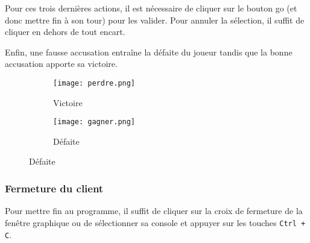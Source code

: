 Pour ces trois dernières actions, il est nécessaire de cliquer sur le bouton go (et donc mettre fin à son tour) pour les valider. Pour annuler la sélection, il suffit de cliquer en dehors de tout encart.

Enfin, une fausse accusation entraîne la défaite du joueur tandis que la bonne accusation apporte sa victoire.

\begin{figure}[H]
     \centering
     \begin{subfigure}{.45\linewidth}
         \centering
         \texttt{[image: perdre.png]}
         \caption{Victoire}
		\label{fig:victoire}
     \end{subfigure}
     \hspace{1em}
     \begin{subfigure}{.45\linewidth}
         \centering
         \texttt{[image: gagner.png]}
         \caption{Défaite}
		\label{fig:defaite}
     \end{subfigure}
\end{figure}

\subsubsection{Fermeture du client}

Pour mettre fin au programme, il suffit de cliquer sur la croix de fermeture de la fenêtre graphique ou de sélectionner sa console et appuyer sur les touches \verb|Ctrl + C|.